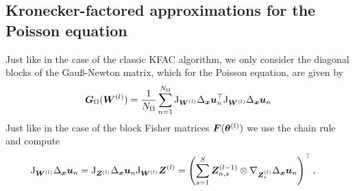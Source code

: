 \subsection{Kronecker-factored approximations for the Poisson equation}\label{sec:KFAC-Laplace}
Just like in the case of the classic KFAC algorithm, we only consider the diagonal blocks of the Gauß-Newton matrix, which for the Poisson equation, are given by
\begin{align}
    {\bm{G}}_\Omega({\bm{W}}^{(l)}) = \frac1{{N_\Omega}} \sum_{n=1}^{N_\Omega} \mathrm{J}_{{\bm{W}}^{(l)}} \Delta_{\bm{x}} {\bm{u}}_n^\top \mathrm{J}_{{\bm{W}}^{(l)}} \Delta_{\bm{x}} {\bm{u}}_n
\end{align}
Just like in the case of the block Fisher matrices ${\bm{F}}({\bm{\theta}}^{(l)})$ we use the chain rule and compute
\begin{align*}
    \jac_{\mW^{(l)}} \Delta_\vx \vu_n & = \jac_{\mZ^{(l)}}\Delta_\vx \vu_n \jac_{\mW^{(l)}} \mZ^{(l)} %
    = \left(\sum_{s=1}^S \mZ^{(l-1)}_{n,s} \otimes \nabla_{\mZ^{(l)}_s} \Delta_{\vx}\vu_n\right)^\top,
\end{align*}
